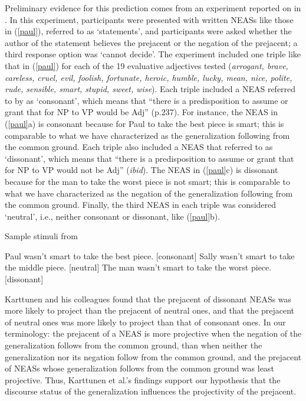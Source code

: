 \documentclass[11pt,fleqn]{article}
\newcommand{\6}{\mbox{$[\hspace*{-.6mm}[$}}
\newcommand{\9}{\mbox{$]\hspace*{-.6mm}]$}}
\begin{document}
Preliminary evidence for this prediction comes from an experiment reported on in \citealt{karttunen-etal2014}. In this experiment, participants were presented with written NEASs like those in (\ref{paul}), referred to as `statements', and participants were asked whether the author of the statement believes  the prejacent or the negation of the prejacent; a third response option was `cannot decide'. The experiment included one triple like that in (\ref{paul}) for each of the 19 evaluative adjectives tested ({\em arrogant, brave, careless, cruel, evil,
foolish, fortunate, heroic, humble, lucky, mean, nice, polite, rude,
sensible, smart, stupid, sweet, wise}). Each triple included a NEAS referred to by \citet{karttunen-etal2014} as `consonant', which means that ``there is a predisposition to assume or grant that for NP to VP would be Adj'' (p.237). For instance, the NEAS in (\ref{paul}a) is consonant because for Paul to take the best piece is smart; this is comparable to what we have characterized as the generalization following from the common ground. Each triple also included a NEAS that \citet{karttunen-etal2014} referred to as `dissonant', which means that ``there is a predisposition to assume or grant that for NP to VP would not be Adj'' ({\em ibid}). The NEAS in (\ref{paul}c) is dissonant because for the man to take the worst piece is not smart; this is comparable to what we have characterized as the negation of the generalization following from the common ground. Finally, the third NEAS in each triple was considered `neutral', i.e., neither consonant or dissonant, like (\ref{paul}b).

\begin{exe}
\ex\label{paul} Sample stimuli from \citealt[241]{karttunen-etal2014}
\begin{xlist}
\ex Paul wasn't smart to take the best piece. \hfill [consonant]
\ex Sally wasn't smart to take the middle piece.  \hfill [neutral]
\ex The man wasn't smart to take the worst piece. \hfill [dissonant]
\end{xlist}
\end{exe}

Karttunen and his colleagues found that the prejacent of dissonant NEASs was more likely to project than the prejacent of neutral ones, and that the prejacent of neutral ones was more likely to project than that of consonant ones. In our terminology: the prejacent of a NEAS is more projective when the negation of the generalization follows from the common ground, than when neither the generalization nor its negation follow from the common ground, and the prejacent of NEASs whose generalization follows from the common ground was least projective. Thus, Karttunen et al.'s findings support our hypothesis that the discourse status of the generalization influences the projectivity of the prejacent.
\end{document}
